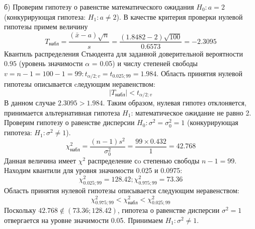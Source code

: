 \documentclass[a4paper,12pt]{article} %
\begin{document}
б) Проверим гипотезу о равенстве математического ожидания \(H_0: a=2\)
(конкурирующая гипотеза: \(H_1: a \neq 2\)). В качестве критерия проверки нулевой
гипотезы примем величину
\[
  T_{набл} = \frac{(\bar{x} - a)\sqrt{n}}{s} = \frac{(1.8482 - 2)\sqrt{100}}{0.6573} = -2.3095
\]
Квантиль распределения Стьюдента для заданной доверительной вероятности
\(0.95\) (уровень значимости \(\alpha\) = 0.05) и числу степеней свободы \(v = n - 1=100-1=99: t_{\alpha / 2;v} = t_{0.025;99} = 1.984\).
Область принятия нулевой гипотезы описывается cледующим неравенством:
\[
  |T_{набл}| < t_{\alpha/2;v}
\]
В данном случае \(2.3095 > 1.984\). Таким образом, нулевая гипотез отклоняется,
принимается альтернативная гипотеза \(H_1\): математическое ожидание не равно 2.
Проверим гипотезу о равенстве дисперсии \(H_0: \sigma^2 = \sigma_0^2 = 1\)
(конкурирующая гипотеза: \(H_1:\sigma^2 \neq1\)).
\[
  \chi^2_{набл} = \frac{(n - 1)s^2}{\sigma_0^2} = \frac{99\times 0.432}{1} = 42.768
\]
Данная величина имеет \(\chi^2\) распределение сo степенью свободы \(n - 1 = 99\). Находим
квантили для уровня значимости 0.025 и 0.0975:
\[
  \chi^2_{0.025;99} = 128.42;  \chi^2_{0.975;99} = 73.36
\]
Область принятия нулевой гипотезы описывается следующим неравенством:
\[
  \chi^2_{0.975;99} < \chi^2_{набл} < \chi^2_{0.025;99}
\]
Поскольку \(42.768 \notin (73.36; 128.42)\), гипотеза о равенстве дисперсии \(\sigma^2 = 1\)
отвергается на уровне значимости 0.05. Принимаем \(H_1: \sigma^2 \neq 1\).
\end{document}
